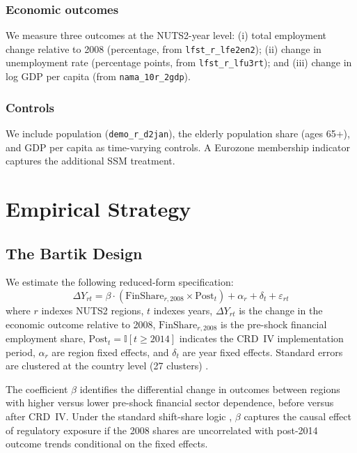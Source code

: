 \documentclass[12pt]{article}
\newcommand{\ind}{\mathbb{I}}
\begin{document}
\subsubsection*{Economic outcomes} We measure three outcomes at the NUTS2-year level: (i) total employment change relative to 2008 (percentage, from \texttt{lfst\_r\_lfe2en2}); (ii) change in unemployment rate (percentage points, from \texttt{lfst\_r\_lfu3rt}); and (iii) change in log GDP per capita (from \texttt{nama\_10r\_2gdp}).

\subsubsection*{Controls} We include population (\texttt{demo\_r\_d2jan}), the elderly population share (ages 65+), and GDP per capita as time-varying controls. A Eurozone membership indicator captures the additional SSM treatment.



\section{Empirical Strategy}

\subsection{The Bartik Design}

We estimate the following reduced-form specification:
\begin{equation}
\Delta Y_{rt} = \beta \cdot (\text{FinShare}_{r,2008} \times \text{Post}_t) + \alpha_r + \delta_t + \varepsilon_{rt}
\label{eq:main}
\end{equation}
where $r$ indexes NUTS2 regions, $t$ indexes years, $\Delta Y_{rt}$ is the change in the economic outcome relative to 2008, $\text{FinShare}_{r,2008}$ is the pre-shock financial employment share, $\text{Post}_t = \ind[t \geq 2014]$ indicates the CRD~IV implementation period, $\alpha_r$ are region fixed effects, and $\delta_t$ are year fixed effects. Standard errors are clustered at the country level (27 clusters) \citep{cameron2015clustered}.

The coefficient $\beta$ identifies the differential change in outcomes between regions with higher versus lower pre-shock financial sector dependence, before versus after CRD~IV. Under the standard shift-share logic \citep{borusyak2022shifshare}, $\beta$ captures the causal effect of regulatory exposure if the 2008 shares are uncorrelated with post-2014 outcome trends conditional on the fixed effects.
\end{document}
